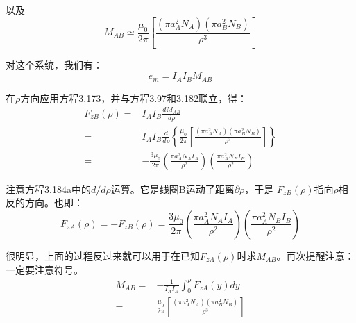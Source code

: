 以及
\begin{equation*}%
M_{AB}\simeq\frac{\mu_0}{2\pi}\left[\frac{(\pi a_{A}^{2}N_A)(\pi a_{B}^{2}N_B)}{\rho^3}\right] \tag{3.97}
\end{equation*}

对这个系统，我们有：
\begin{equation}%
e_m=I_AI_BM_{AB}
\end{equation}

在$\rho$方向应用方程3.173，并与方程3.97和3.182联立，得：
\begin{subequations}%
	\begin{align}
F_{zB}(\rho)=&I_A I_B\frac{dM_{AB}}{d\rho}\\
=&I_A I_B\frac{d}{d\rho}\left\{\frac{\mu_0}{2\pi}\left[\frac{(\pi a_{A}^{2}N_A)(\pi a_{B}^{2}N_B)}{\rho^3}\right]\right\}\\
=&-\frac{3\mu_0}{2\pi}\left(\frac{\pi a_{A}^{2}N_A I_A}{\rho^2}\right)\left(\frac{\pi a_{A}^{2}N_B I_B}{\rho^2}\right)
	\end{align}
\end{subequations}

注意方程3.184a中的$d/d\rho$运算。它是线圈B运动了距离$\partial\rho$，于是
$F_{zB}(\rho)$指向$\rho$相反的方向。也即：
\begin{equation*}%
F_{zA}(\rho)=-F_{zB}(\rho)
=\frac{3\mu_0}{2\pi}\left(\frac{\pi a_{A}^{2}N_A I_A}{\rho^2}\right)\left(\frac{\pi a_{A}^{2}N_B I_B}{\rho^2}\right)\tag{3.39c}
\end{equation*}

很明显，上面的过程反过来就可以用于在已知$F_{zA}(\rho)$时求$M_{AB}$。再次提醒注意：一定要注意符号。
\begin{align*}%
M_{AB}=&-\frac{1}{I_AI_B}\int_{0}^{\rho}F_{zA}(y)dy\tag{3.185}\\
=&\frac{\mu_0}{2\pi}\left[\frac{(\pi a_{A}^{2}N_A)(\pi a_{B}^{2}N_B)}{\rho^3}\right]\tag{3.97}
\end{align*}